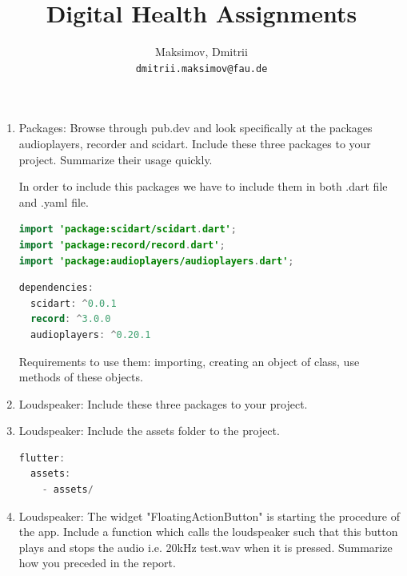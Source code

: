 \documentclass{homework}
\title{Digital Health Assignments}
\author{
  Maksimov, Dmitrii\\
  \texttt{dmitrii.maksimov@fau.de}
}
\begin{document}
\maketitle

\setcounter{exercise}{1}
\exercise
\begin{enumerate}
	\item Packages: Browse through pub.dev and look specifically at the packages audioplayers, recorder and scidart. Include these three packages to your project. Summarize their usage quickly.

	In order to include this packages we have to include them in both .dart file and .yaml file.
	\begin{lstlisting}[language=Java, caption=Insertion of packages in .dart file]
import 'package:scidart/scidart.dart';
import 'package:record/record.dart';
import 'package:audioplayers/audioplayers.dart';
	\end{lstlisting}
	\begin{lstlisting}[language=Java, caption=Insertion of packages in .yaml file]
dependencies:
  scidart: ^0.0.1
  record: ^3.0.0
  audioplayers: ^0.20.1
	\end{lstlisting}
	Requirements to use them: importing, creating an object of class, use methods of these objects.
	\item Loudspeaker: Include these three packages to your project.
	\item Loudspeaker: Include the assets folder to the project.

	\begin{lstlisting}[language=Java, caption=Insertion of the folder in .yaml file]
flutter:
  assets:
    - assets/
	\end{lstlisting}
	\item Loudspeaker: The widget "FloatingActionButton" is starting the procedure of the app. Include a function which calls the loudspeaker such that this button plays and stops the audio i.e. 20kHz test.wav when it is pressed. Summarize how you preceded in the report.


\end{enumerate}
\end{document}
